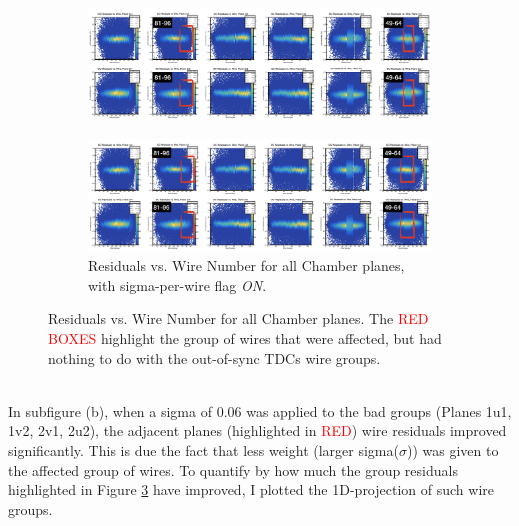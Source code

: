 \documentclass[11pt]{article}
\begin{document}
\begin{figure}[h!]
\centering
\begin{subfigure}{.5\textwidth}
  \hspace*{-5cm}                                                           
  \centering
  \includegraphics[width=2.1\linewidth]{2d_residuals_flagOFF.png}
  \label{fig:2d_res_flagOff}
\end{subfigure}%

\begin{subfigure}{.5\textwidth}
\hspace*{-5cm}                                                           
  \centering
  \includegraphics[width=2.1\linewidth]{2d_residuals_flagON.png}
  \caption{Residuals vs. Wire Number for all Chamber planes, with sigma-per-wire flag \textit{ON}.}
  \label{fig:2d_res_flagON}
\end{subfigure}
\caption{Residuals vs. Wire Number for all Chamber planes. The \textcolor{red}{RED BOXES} highlight the group of wires that were affected, but had nothing to do with the
  out-of-sync TDCs wire groups.}
\label{fig:wire_residuals_flag}
\end{figure}\\
In subfigure (b), when a sigma of 0.06 was applied to the bad groups (Planes 1u1, 1v2, 2v1, 2u2), the adjacent planes (highlighted in \textcolor{red}{RED})
wire residuals improved significantly. This is due the fact that less weight (larger sigma($\sigma$)) was given to the affected group of wires.
To quantify by how much the group residuals highlighted in Figure \ref{fig:wire_residuals_flag} have improved, I plotted the 1D-projection of such wire groups.
\end{document}
